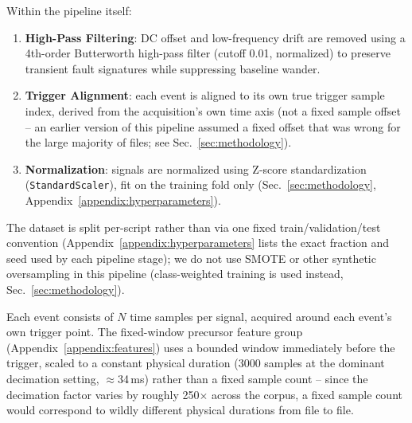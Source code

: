 Within the pipeline itself:

\begin{enumerate}
    \item \textbf{High-Pass Filtering}: DC offset and low-frequency drift are removed using a 4th-order Butterworth high-pass filter (cutoff 0.01, normalized) to preserve transient fault signatures while suppressing baseline wander. %

    \item \textbf{Trigger Alignment}: each event is aligned to its own true trigger sample index, derived from the acquisition's own time axis (not a fixed sample offset -- an earlier version of this pipeline assumed a fixed offset that was wrong for the large majority of files; see Sec.~\ref{sec:methodology}).

    \item \textbf{Normalization}: signals are normalized using Z-score standardization (\texttt{StandardScaler}), fit on the training fold only (Sec.~\ref{sec:methodology}, Appendix~\ref{appendix:hyperparameters}).
\end{enumerate}

The dataset is split per-script rather than via one fixed train/validation/test convention (Appendix~\ref{appendix:hyperparameters} lists the exact fraction and seed used by each pipeline stage); we do not use SMOTE or other synthetic oversampling in this pipeline (class-weighted training is used instead, Sec.~\ref{sec:methodology}).

Each event consists of $N$ time samples per signal, acquired around each event's own trigger point. The fixed-window precursor feature group (Appendix~\ref{appendix:features}) uses a bounded window immediately before the trigger, scaled to a constant physical duration (3000 samples at the dominant decimation setting, $\approx$34\,ms) %
rather than a fixed sample count -- since the decimation factor varies by roughly 250$\times$ across the corpus, %
a fixed sample count would correspond to wildly different physical durations from file to file.
